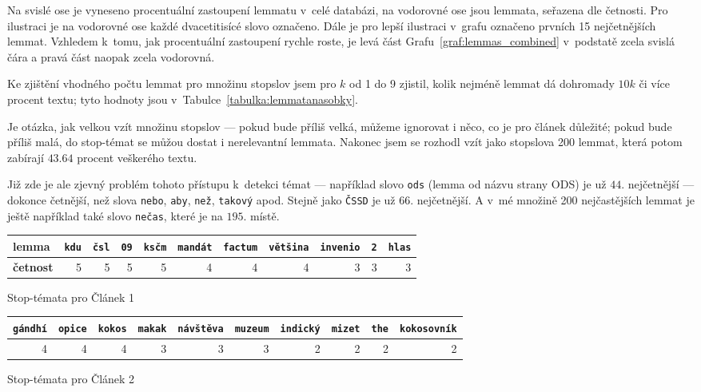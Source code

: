 \documentclass[12pt,a4paper]{report}
\begin{document}
Na svislé ose je vyneseno procentuální zastoupení lemmatu v~celé databázi, na vodorovné ose jsou lemmata, seřazena dle četnosti. Pro ilustraci je na vodorovné ose každé dvacetitisícé slovo označeno. Dále je pro lepší ilustraci v~grafu označeno prvních 15 nejčetnějších lemmat. Vzhledem k~tomu, jak procentuální zastoupení rychle roste, je levá část Grafu~\ref{graf:lemmas_combined} v~podstatě zcela svislá čára a pravá část naopak zcela vodorovná.


Ke zjištění vhodného počtu lemmat pro množinu stopslov jsem pro $k$ od 1 do 9 zjistil, kolik nejméně lemmat dá dohromady $10k$ či více procent textu; tyto hodnoty jsou v~Tabulce~\ref{tabulka:lemmatanasobky}.

Je otázka, jak velkou vzít množinu stopslov --- pokud bude příliš velká, můžeme ignorovat i něco, co je pro článek důležité; pokud bude příliš malá, do stop-témat se můžou dostat i nerelevantní lemmata. Nakonec jsem se rozhodl vzít jako stopslova 200 lemmat, která potom zabírají $43.64$ procent veškerého textu.

Již zde je ale zjevný problém tohoto přístupu k~detekci témat --- například slovo \texttt{ods} (lemma od názvu strany ODS) je už $44.$ nejčetnější --- dokonce četnější, než slova \texttt{nebo}, \texttt{aby}, \texttt{než}, \texttt{takový} apod. Stejně jako \texttt{ČSSD} je už $66.$ nejčetnější. A v~mé množině 200 nejčastějších lemmat je ještě například také slovo \texttt{nečas}, které je na $195.$ místě.


{
    \begin{tabular}{ |l | r |r |r |r |r |r |r |r |r |r | }
        \hline
        \textbf{lemma} & 
        \texttt{kdu} & 
        \texttt{čsl} & 
        \texttt{09} & 
        \texttt{ksčm} & 
        \texttt{mandát} &
        \texttt{factum} & 
        \texttt{většina} & 
        \texttt{invenio} & 
        \texttt{2} & 
        \texttt{hlas} \\ \hline
        
        \textbf{četnost}  & 5 & 5 & 5 & 5 & 4 & 4 & 4 & 3 & 3 & 3 \\ \hline
        
        
      \end{tabular}

}{Stop-témata pro Článek 1}


{
    \begin{tabular}{ | r |r |r |r |r |r |r |r |r |r | }
        \hline
        \texttt{gándhí} & 
        \texttt{opice} & 
        \texttt{kokos} & 
        \texttt{makak} & 
        \texttt{návštěva} & 
        \texttt{muzeum} &
        \texttt{indický} &
        \texttt{mizet} & 
        \texttt{the} & 
        \texttt{kokosovník} \\ \hline
        
        
        4  & 4  & 4  & 3 & 3 & 3  & 2 & 2 & 2 & 2 \\ \hline
      \end{tabular}


}{Stop-témata pro Článek 2}
\end{document}

